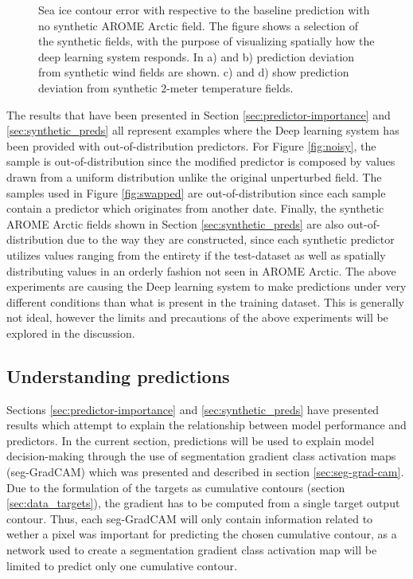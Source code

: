 \documentclass[../main/thesis.tex]{subfiles}
\begin{document}
\begin{figure}
\begin{subfigure}[t]{.455\textwidth}
    \end{subfigure}
    \caption{\label{fig:synthetic_aa_bias}Sea ice contour error with respective to the baseline prediction with no synthetic AROME Arctic field. The figure shows a selection of the synthetic fields, with the purpose of visualizing spatially how the deep learning system responds. In a) and b) prediction deviation from synthetic wind fields are shown. c) and d) show prediction deviation from synthetic 2-meter temperature fields.}
\end{figure}

The results that have been presented in Section \ref{sec:predictor-importance} and \ref{sec:synthetic_preds} all represent examples where the Deep learning system has been provided with out-of-distribution predictors. For Figure \ref{fig:noisy}, the sample is out-of-distribution since the modified predictor is composed by values drawn from a uniform distribution unlike the original unperturbed field. The samples used in Figure \ref{fig:swapped} are out-of-distribution since each sample contain a predictor which originates from another date. Finally, the synthetic AROME Arctic fields shown in Section \ref{sec:synthetic_preds} are also out-of-distribution due to the way they are constructed, since each synthetic predictor utilizes values ranging from the entirety if the test-dataset as well as spatially distributing values in an orderly fashion not seen in AROME Arctic. The above experiments are causing the Deep learning system to make predictions under very different conditions than what is present in the training dataset. This is generally not ideal, however the limits and precautions of the above experiments will be explored in the discussion.

\subsection{Understanding predictions}
Sections \ref{sec:predictor-importance} and \ref{sec:synthetic_preds} have presented results which attempt to explain the relationship between model performance and predictors. In the current section, predictions will be used to explain model decision-making through the use of segmentation gradient class activation maps (seg-GradCAM) \citep{Vinogradova2020} which was presented and described in section \ref{sec:seg-grad-cam}. Due to the formulation of the targets as cumulative contours (section \ref{sec:data_targets}), the gradient has to be computed from a single target output contour. Thus, each seg-GradCAM will only contain information related to wether a pixel was important for predicting the chosen cumulative contour, as a network used to create a segmentation gradient class activation map will be limited to predict only one cumulative contour. 
\end{document}
